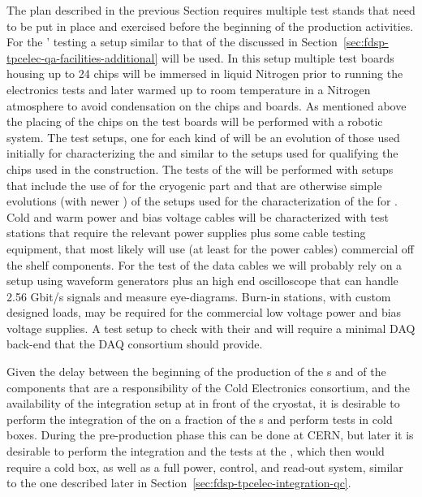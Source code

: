 The  plan described in the previous Section requires
multiple test stands that need to be put in place and exercised 
before the beginning of the production activities. For the '
testing a setup similar to that of the  discussed in
Section~\ref{sec:fdsp-tpcelec-qa-facilities-additional} will
be used. In this setup multiple test boards housing up to 24
chips will be immersed in liquid Nitrogen prior to running the
electronics tests and later warmed up to room temperature in 
a Nitrogen atmosphere to avoid condensation on the chips and
boards. As mentioned above the placing of the chips on the test 
boards will be performed with a robotic system. The test setups,
one for each kind of  will be an evolution of those
used initially for characterizing the  and similar
to the setups used for qualifying the chips used in the 
construction. The tests of the  will be performed with
setups that include the use of  for the cryogenic part
and that are otherwise simple evolutions (with newer )
of the setups used for the characterization of the 
for . Cold and warm power and bias voltage cables will
be characterized with test stations that require the relevant 
power supplies plus some cable testing equipment, that most likely will
use (at least for the power cables) commercial off the shelf components.
For the test of the data cables we will probably rely on a setup
using waveform generators plus an high end oscilloscope that 
can handle 2.56 Gbit/s signals and measure eye-diagrams. 
Burn-in stations, with custom designed loads, may be required for 
the commercial low voltage power and bias voltage supplies.
A test setup to check  with their 
and  will require a minimal DAQ back-end that the
DAQ consortium should provide.

Given the delay between the beginning of the production of the
s and of the components that are a responsibility of
the Cold  Electronics consortium, and the availability of the
integration setup at \surf in front of the cryostat, it is
desirable to  perform the integration of the 
on a fraction of the s and perform tests in cold
boxes. During the pre-production phase this can be done at CERN,
but later it is desirable to perform the integration and the
tests at the , which then would require a cold box,
as well as a full power, control, and read-out system, similar
to the one described later in Section~\ref{sec:fdsp-tpcelec-integration-qc}.
